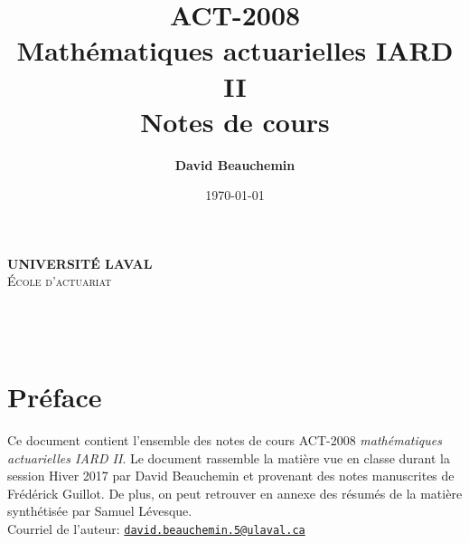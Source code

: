 \documentclass[11pt,french]{report}
\title{ACT-2008 \\ Mathématiques actuarielles IARD II \\ Notes de cours}
\author{\textbf{David Beauchemin}}
\date{\today}
\begin{document}
\makeatletter
  \begin{titlepage}
  \centering
      {\large \textbf{\textsc{UNIVERSITÉ LAVAL}}}\\
      \textsc{École d'actuariat}\\
    \vspace{2cm}
    \vspace{2cm}
      {\LARGE \textbf{\@title}} \\
    \vfill
       {\large \@author} \\
    \vspace{4cm}
        {\large\textbf{\@date}}\\
    \vfill
  \end{titlepage}
\makeatother
\newpage

\tableofcontents


\chapter*{Préface}
Ce document contient l'ensemble des notes de cours ACT-2008 \textit{mathématiques actuarielles IARD II}. Le document rassemble la matière vue en classe durant la session Hiver 2017 par David Beauchemin et provenant des notes manuscrites de Frédérick Guillot.
De plus, on peut retrouver en annexe des résumés de la matière synthétisée par Samuel Lévesque.
\\
Courriel de l'auteur: \href{mailto:david.beauchemin.5@ulaval.ca}{\nolinkurl{david.beauchemin.5@ulaval.ca}}




















\appendix



\end{document}
